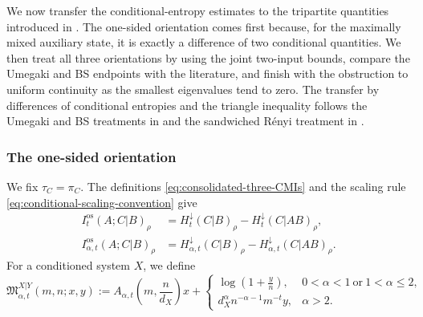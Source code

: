 \documentclass[11pt]{article}
\theoremstyle{remark}
\DeclareMathOperator{\os}{os}
\newcommand{\1}{\mathbbm{1}}
\begin{document}
We now transfer the conditional-entropy estimates to the tripartite
quantities introduced in
.  The one-sided orientation
comes first because, for the maximally mixed auxiliary state, it is
exactly a difference of two conditional quantities.  We then treat
all three orientations by using the joint two-input bounds, compare
the Umegaki and BS endpoints with the literature, and finish with the
obstruction to uniform continuity as the smallest eigenvalues tend to
zero.
The transfer by differences of conditional entropies and the triangle
inequality follows the Umegaki and BS treatments in
\cite[Sections~5.2.3 and~6.2.3]{bluhm2023continuity} and the
sandwiched R\'enyi treatment in
\cite[Section~5.3]{bluhm2026unified}.

\subsubsection{The one-sided orientation}

We fix $\tau_C=\pi_C$.  The definitions
\eqref{eq:consolidated-three-CMIs} and the scaling rule
\eqref{eq:conditional-scaling-convention} give
\begin{align}
 I_t^{\os}(A;C|B)_\rho
 &=H_t^\downarrow(C|B)_\rho
   -H_t^\downarrow(C|AB)_\rho,
 \label{eq:one-sided-t-CMI-entropy-difference}\\
 I_{\alpha,t}^{\os}(A;C|B)_\rho
 &=H_{\alpha,t}^\downarrow(C|B)_\rho
   -H_{\alpha,t}^\downarrow(C|AB)_\rho.
 \label{eq:one-sided-alpha-t-CMI-entropy-difference}
\end{align}
For a conditioned system $X$, we define
\begin{equation}
 \mathfrak M_{\alpha,t}^{X|Y}(m,n;x,y)
 :=A_{\alpha,t}\!\left(m,\frac{n}{d_X}\right)x
 +\begin{cases}
 \displaystyle\log\left(1+\frac{y}{n}\right),
 &0<\alpha<1\ \text{or}\ 1<\alpha\leq2,\\[2mm]
 \displaystyle d_X^\alpha n^{-\alpha-1}m^{-t}y,
 &\alpha>2.
 \end{cases}
 \label{eq:tCMI-Renyi-slab-modulus}
\end{equation}
\end{document}
